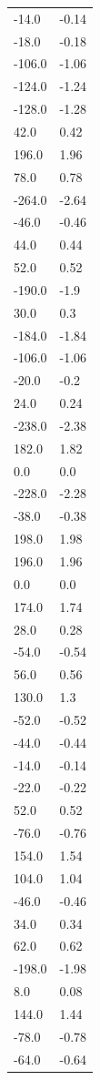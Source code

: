\begin{longtable}{ll}
-14.0 & -0.14 \\
-18.0 & -0.18 \\
-106.0 & -1.06 \\
-124.0 & -1.24 \\
-128.0 & -1.28 \\
42.0 & 0.42 \\
196.0 & 1.96 \\
78.0 & 0.78 \\
-264.0 & -2.64 \\
-46.0 & -0.46 \\
44.0 & 0.44 \\
52.0 & 0.52 \\
-190.0 & -1.9 \\
30.0 & 0.3 \\
-184.0 & -1.84 \\
-106.0 & -1.06 \\
-20.0 & -0.2 \\
24.0 & 0.24 \\
-238.0 & -2.38 \\
182.0 & 1.82 \\
0.0 & 0.0 \\
-228.0 & -2.28 \\
-38.0 & -0.38 \\
198.0 & 1.98 \\
196.0 & 1.96 \\
0.0 & 0.0 \\
174.0 & 1.74 \\
28.0 & 0.28 \\
-54.0 & -0.54 \\
56.0 & 0.56 \\
130.0 & 1.3 \\
-52.0 & -0.52 \\
-44.0 & -0.44 \\
-14.0 & -0.14 \\
-22.0 & -0.22 \\
52.0 & 0.52 \\
-76.0 & -0.76 \\
154.0 & 1.54 \\
104.0 & 1.04 \\
-46.0 & -0.46 \\
34.0 & 0.34 \\
62.0 & 0.62 \\
-198.0 & -1.98 \\
8.0 & 0.08 \\
144.0 & 1.44 \\
-78.0 & -0.78 \\
-64.0 & -0.64 \\

\end{longtable}
